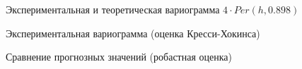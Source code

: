 \begin{figure}[H]
\caption{Экспериментальная и теоретическая вариограмма $ 4 \cdot Per(h, 0.898) $}
\label{img:per-cv-modeled}
\end{figure}

\begin{figure}[H]
\caption{Экспериментальная вариограмма (оценка Кресси-Хокинса)}
\label{img:robust-variogram}
\end{figure}

\begin{figure}[H]
\caption{Сравнение прогнозных значений (робастная оценка)}
\label{img:robust-best-cross-prediction}
\end{figure}

